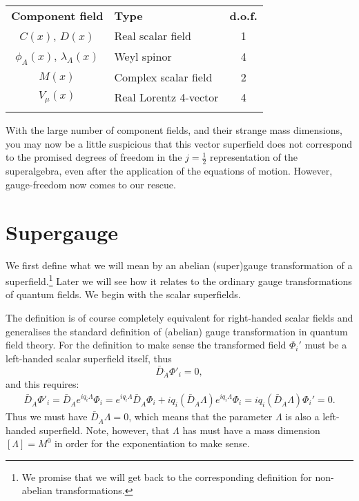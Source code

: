 \documentclass[notes.tex]{subfiles}
\begin{document}
\begin{center}
   \begin{tabular}{c |l| c} 
   \noalign{\smallskip}\hline\noalign{\smallskip}
   {\bf Component field} & {\bf Type} & {\bf d.o.f.} \\
   \noalign{\smallskip}\hline\noalign{\smallskip}
   $C(x)$, $D(x)$ & Real scalar field& 1\\
  $\phi_A(x)$, $\lambda_A(x)$ &Weyl spinor & 4\\
  $M(x)$ &Complex scalar field & 2\\
  $V_\mu(x)$ & Real Lorentz 4-vector & 4\\
  \noalign{\smallskip}\hline\noalign{\smallskip}
    \end{tabular}
   \end{center}

With the large number of component fields, and their strange mass dimensions, you may now be a little suspicious that this vector superfield does not correspond to the promised degrees of freedom in the $j=\frac{1}{2}$ representation of the superalgebra, even after the application of the equations of motion. However, gauge-freedom now comes to our rescue.



\section{Supergauge}
We first define what we will mean by an abelian (super)gauge transformation of a superfield.\footnote{We promise that we will get back to the corresponding definition for non-abelian transformations.} Later we will see how it relates to the ordinary gauge transformations of quantum fields. We begin with the scalar superfields.

The definition is of course completely equivalent for right-handed scalar fields and generalises the standard definition of (abelian) gauge transformation in quantum field theory.
For the definition to make sense the transformed field $\Phi_i'$ must be a left-handed scalar superfield itself, thus
\[\bar{D}_{\dot{A}}\Phi'_i = 0,\]
and this requires:
\begin{eqnarray*}
\bar{D}_{\dot{A}}\Phi'_i = \bar{D}_{\dot{A}}e^{iq_i\Lambda }\Phi_i =  e^{iq_i\Lambda }\bar{D}_{\dot{A}}\Phi_i +iq_i(\bar{D}_{\dot{A}}\Lambda)e^{i q_i\Lambda}\Phi_i
= iq_i(\bar{D}_{\dot{A}}\Lambda)\Phi_i'=0.
\end{eqnarray*}
Thus we must have $\bar{D}_{\dot{A}}\Lambda = 0$, which means that  the parameter $\Lambda$ is also a left-handed superfield. Note, however, that $\Lambda$ has must have a mass dimension $[\Lambda]=M^0$ in order for the exponentiation to make sense.
\end{document}
